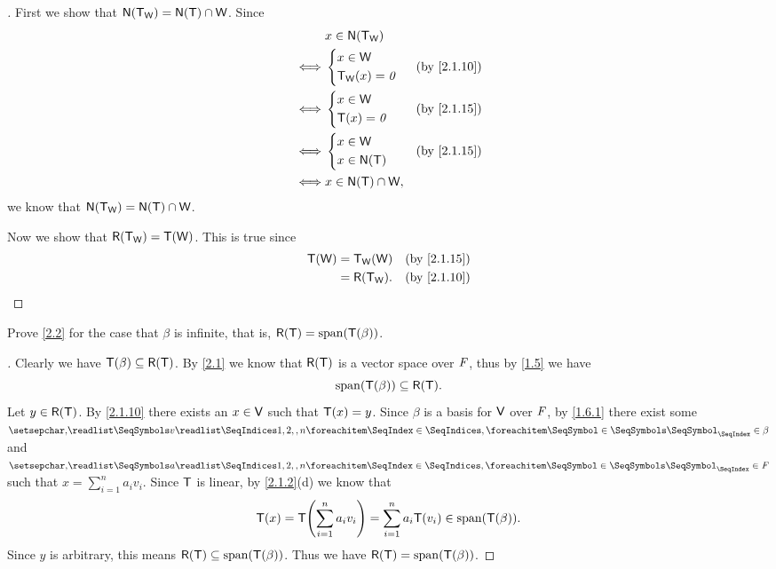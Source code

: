 \begin{proof}[]
  First we show that \(\ns{\T_{\W}} = \ns{\T} \cap \W\).
  Since
  \begin{align*}
         & x \in \ns{\T_{\W}}                                  \\
    \iff & \begin{dcases}
             x \in \W \\
             \T_{\W}(x) = \zv
           \end{dcases}       &  & \text{(by \cref{2.1.10})}   \\
    \iff & \begin{dcases}
             x \in \W \\
             \T(x) = \zv
           \end{dcases}         &  & \text{(by \cref{2.1.15})} \\
    \iff & \begin{dcases}
             x \in \W \\
             x \in \ns{\T}
           \end{dcases}         &  & \text{(by \cref{2.1.15})} \\
    \iff & x \in \ns{\T} \cap \W,
  \end{align*}
  we know that \(\ns{\T_{\W}} = \ns{\T} \cap \W\).

  Now we show that \(\rg{\T_{\W}} = \T(\W)\).
  This is true since
  \begin{align*}
    \T(\W) & = \T_{\W}(\W)   &  & \text{(by \cref{2.1.15})} \\
           & = \rg{\T_{\W}}. &  & \text{(by \cref{2.1.10})}
  \end{align*}
\end{proof}

\begin{ex}\label{ex:2.1.33}
  Prove \cref{2.2} for the case that \(\beta\) is infinite, that is, \(\rg{\T} = \spn{\T(\beta)}\).
\end{ex}

\begin{proof}[]
  Clearly we have \(\T(\beta) \subseteq \rg{\T}\).
  By \cref{2.1} we know that \(\rg{\T}\) is a vector space over \(\mathit{F}\), thus by \cref{1.5} we have
  \[
    \spn{\T(\beta)} \subseteq \rg{\T}.
  \]
  Let \(y \in \rg{\T}\).
  By \cref{2.1.10} there exists an \(x \in \mathsf{V}\) such that \(\mathsf{T}(x) = y\).
  Since \(\beta\) is a basis for \(\mathsf{V}\) over \(\mathit{F}\), by \cref{1.6.1} there exist some \(\seq{v}{1,2,,n} \in \beta\) and \(\seq{a}{1,2,,n} \in \F\) such that \(x = \sum_{i = 1}^n a_i v_i\).
  Since \(\mathsf{T}\) is linear, by \cref{2.1.2}(d) we know that
  \[
    \T(x) = \T\pa{\sum_{i = 1}^n a_i v_i} = \sum_{i = 1}^n a_i \T(v_i) \in \spn{\T(\beta)}.
  \]
  Since \(y\) is arbitrary, this means \(\rg{\T} \subseteq \spn{\T(\beta)}\).
  Thus we have \(\rg{\T} = \spn{\T(\beta)}\).
\end{proof}

